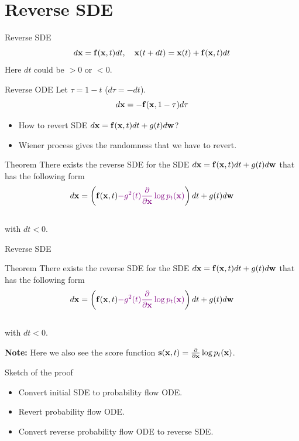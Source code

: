 \section{Reverse SDE}
\begin{frame}{Reverse SDE}
	\vspace{-0.3cm}
	\[
		d\mathbf{x} = \mathbf{f}(\mathbf{x}, t) dt, \quad \mathbf{x}(t + dt) = \mathbf{x}(t) + \mathbf{f}(\mathbf{x}, t) dt
	\]
	Here $dt$ could be $>0$ or $<0$. 
	\begin{block}{Reverse ODE}
		Let $\tau = 1 - t$ ($d\tau = -dt$).
		\vspace{-0.3cm}
		\[
			d\mathbf{x} = - \mathbf{f}(\mathbf{x}, 1 - \tau) d \tau
		\]
	\end{block}
	\vspace{-0.5cm}
	\begin{itemize}
		\item How to revert SDE $d\mathbf{x} = \mathbf{f}(\mathbf{x}, t) dt + g(t) d \mathbf{w}$? 
		\item Wiener process gives the randomness that we have to revert.
	\end{itemize}
	\vspace{-0.3cm}
	\begin{block}{Theorem}
		There exists the reverse SDE for the SDE $d\mathbf{x} = \mathbf{f}(\mathbf{x}, t) dt + g(t) d \mathbf{w}$ that has the following form
		\vspace{-0.3cm}
		\[
			d\mathbf{x} = \left(\mathbf{f}(\mathbf{x}, t) {\color{violet}- g^2(t) \frac{\partial}{\partial \mathbf{x}}\log p_t(\mathbf{x})}\right) dt + g(t) d \mathbf{w}
		\]
		\vspace{-0.5cm} \\
		with $dt < 0$.
	\end{block}
\end{frame}
\begin{frame}{Reverse SDE}
	\begin{block}{Theorem}
		There exists the reverse SDE for the SDE $d\mathbf{x} = \mathbf{f}(\mathbf{x}, t) dt + g(t) d \mathbf{w}$ that has the following form
		\vspace{-0.3cm}
		\[
			d\mathbf{x} = \left(\mathbf{f}(\mathbf{x}, t) {\color{violet}- g^2(t) \frac{\partial}{\partial \mathbf{x}}\log p_t(\mathbf{x})}\right) dt + g(t) d \mathbf{w}
		\]
		\vspace{-0.5cm} \\
		with $dt < 0$.
	\end{block}
	\textbf{Note:} Here we also see the score function $\mathbf{s}(\mathbf{x}, t) = \frac{\partial}{\partial \mathbf{x}} \log p_t(\mathbf{x})$.
	\begin{block}{Sketch of the proof}
		\begin{itemize}
			\item Convert initial SDE to probability flow ODE.
			\item Revert probability flow ODE.
			\item Convert reverse probability flow ODE to reverse SDE.
		\end{itemize}
	\end{block}
\end{frame}
